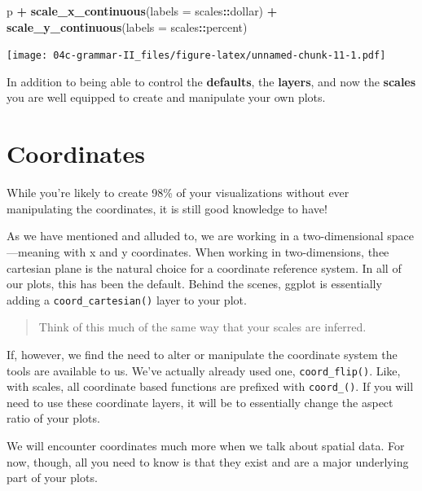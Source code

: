 \documentclass[
]{book}
\newenvironment{Shaded}{\begin{snugshade}}{\end{snugshade}}
\newcommand{\DataTypeTok}[1]{\textcolor[rgb]{0.13,0.29,0.53}{#1}}
\newcommand{\KeywordTok}[1]{\textcolor[rgb]{0.13,0.29,0.53}{\textbf{#1}}}
\newcommand{\NormalTok}[1]{#1}
\newcommand{\OperatorTok}[1]{\textcolor[rgb]{0.81,0.36,0.00}{\textbf{#1}}}
\newcommand{\StringTok}[1]{\textcolor[rgb]{0.31,0.60,0.02}{#1}}
\begin{document}
\begin{Shaded}
\begin{Highlighting}[]
\NormalTok{p }\OperatorTok{+}\StringTok{ }
\StringTok{  }\KeywordTok{scale\_x\_continuous}\NormalTok{(}\DataTypeTok{labels =}\NormalTok{ scales}\OperatorTok{::}\NormalTok{dollar) }\OperatorTok{+}\StringTok{ }
\StringTok{  }\KeywordTok{scale\_y\_continuous}\NormalTok{(}\DataTypeTok{labels =}\NormalTok{ scales}\OperatorTok{::}\NormalTok{percent)}
\end{Highlighting}
\end{Shaded}

\texttt{[image: 04c-grammar-II\_files/figure-latex/unnamed-chunk-11-1.pdf]}

In addition to being able to control the \textbf{defaults}, the \textbf{layers}, and now the \textbf{scales} you are well equipped to create and manipulate your own plots.

\hypertarget{coordinates}{%
\section{Coordinates}\label{coordinates}}

While you're likely to create 98\% of your visualizations without ever manipulating the coordinates, it is still good knowledge to have!

As we have mentioned and alluded to, we are working in a two-dimensional space---meaning with x and y coordinates. When working in two-dimensions, thee cartesian plane is the natural choice for a coordinate reference system. In all of our plots, this has been the default. Behind the scenes, ggplot is essentially adding a \texttt{coord\_cartesian()} layer to your plot.

\begin{quote}
Think of this much of the same way that your scales are inferred.
\end{quote}

If, however, we find the need to alter or manipulate the coordinate system the tools are available to us. We've actually already used one, \texttt{coord\_flip()}. Like, with scales, all coordinate based functions are prefixed with \texttt{coord\_()}. If you will need to use these coordinate layers, it will be to essentially change the aspect ratio of your plots.

We will encounter coordinates much more when we talk about spatial data. For now, though, all you need to know is that they exist and are a major underlying part of your plots.
\end{document}

